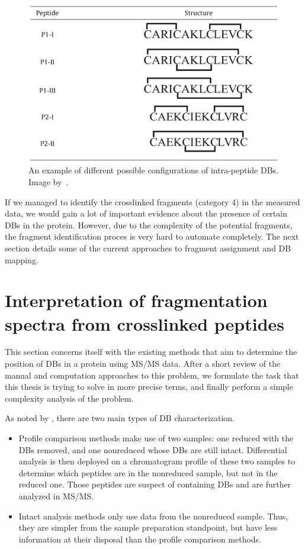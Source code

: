\begin{figure}
  \centering
  \includegraphics[width=.5\linewidth]{img/intrapeptide-bond.jpeg}
  \caption{An example of different possible configurations of intra-peptide DBs. Image by~\citet{durand2013tandem}.}\label{fig:intrapeptide-bonds}
\end{figure}

If we managed to identify the crosslinked fragments (category 4) in the measured data, we would gain a lot of important evidence about the presence of certain DBs in the protein. However, due to the complexity of the potential fragments, the fragment identification proces is very hard to automate completely. The next section details some of the current approaches to fragment assignment and DB mapping.

\section{Interpretation of fragmentation spectra from crosslinked peptides}\label{sec:analysis}

This section concerns itself with the existing methods that aim to determine the position of DBs in a protein using MS/MS data. After a short review of the manual and computation approaches to this problem, we formulate the task that this thesis is trying to solve in more precise terms, and finally perform a simple complexity analysis of the problem.

As noted by \citet{lakbub2018recent}, there are two main types of DB characterization.

\begin{itemize}
  \item Profile comparison methods make use of two samples: one reduced with the DBs removed, and one nonreduced whose DBs are still intact. Differential analysis is then deployed on a chromatogram profile of these two samples to determine which peptides are in the nonreduced sample, but not in the reduced one. Those peptides are suspect of containing DBs and are further analyzed in MS/MS\@.
  \item Intact analysis methods only use data from the nonreduced sample. Thus, they are simpler from the sample preparation standpoint, but have less information at their disposal than the profile comparison methods.
\end{itemize}

